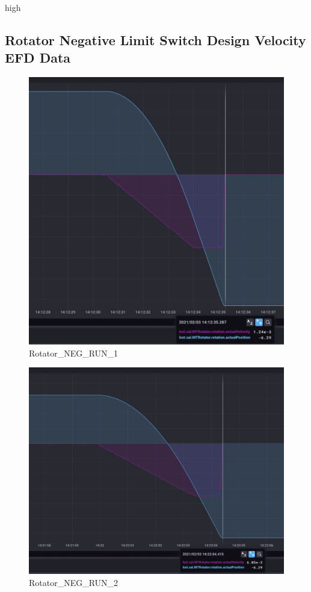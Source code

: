 high\documentclass[SE,lsstdraft,authoryear,toc]{lsstdoc}
\begin{document}
\subsection{Rotator Negative Limit Switch Design Velocity EFD Data}
\begin{figure}[h!]
  \includegraphics[width=\linewidth]{media/Rotator_design_speed_neg_test1.png}
  \caption{Rotator\_NEG\_RUN\_1}
  \label{fig:Rotator_NEG_RUN_1}
\end{figure}
\begin{figure}[h!]
  \includegraphics[width=\linewidth]{media/Rotator_design_speed_neg_test2.png}
  \caption{Rotator\_NEG\_RUN\_2}
  \label{fig:Rotator_NEG_RUN_2}
\end{figure}
\end{document}
